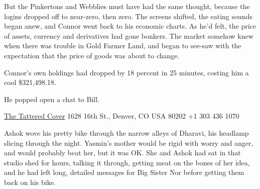But the Pinkertons and Webblies must have had the same thought,
because the logins dropped off to near-zero, then zero. The screens
shifted, the eating sounds began anew, and Connor went back to his
economic charts. As he'd felt, the price of assets, currency and
derivatives had gone bonkers. The market somehow knew when there
was trouble in Gold Farmer Land, and began to see-saw with the
expectation that the price of goods was about to change.

Connor's own holdings had dropped by 18 percent in 25 minutes,
costing him a cool \$321,498.18.

He popped open a chat to Bill.










\tb

{\href{http://www.tatteredcover.com/book/9780765322166}{The Tattered Cover} 1628 16th St., Denver, CO USA 80202 +1 303 436 1070}

Ashok wove his pretty bike through the narrow alleys of Dharavi,
his headlamp slicing through the night. Yasmin's mother would be
rigid with worry and anger, and would probably beat her, but it was
OK. She and Ashok had sat in that studio shed for hours, talking it
through, getting meat on the bones of her idea, and he had left
long, detailed messages for Big Sister Nor before getting them back
on his bike.

